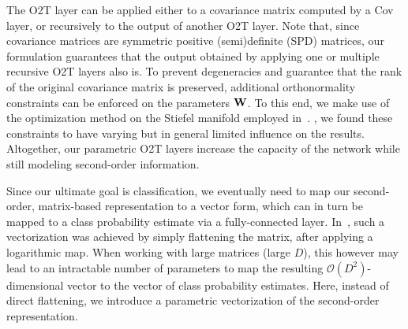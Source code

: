 The O2T layer can be applied  either to a covariance matrix computed by a Cov layer, or recursively to the output of another O2T layer. Note that, since covariance matrices are symmetric positive (semi)definite (SPD) matrices, our formulation guarantees that the output obtained by applying one or multiple recursive O2T layers also is. To prevent degeneracies and guarantee that the rank of the original covariance matrix is preserved, additional orthonormality constraints can be enforced on the parameters ${\bf W}$. To this end, we make use of the optimization method on the Stiefel manifold employed in~\cite{Harandi:2016ug}. , we found these constraints to have varying but in general limited influence on the results. Altogether, our parametric O2T layers increase the capacity of the network while still modeling second-order information.



Since our ultimate goal is classification, we eventually need to map our second-order, matrix-based representation to a vector form, which can in turn be mapped to a class probability estimate via a fully-connected layer. In~\cite{huang2017, Ionescu:2015wa}, such a vectorization was achieved by simply flattening the matrix, after applying a logarithmic map. When working with large matrices (large $D$), this however may lead to an intractable number of parameters to map the resulting $\mathcal{O}(D^2)$-dimensional vector to the vector of class probability estimates. Here, instead of direct flattening, we introduce a parametric vectorization of the second-order representation.


